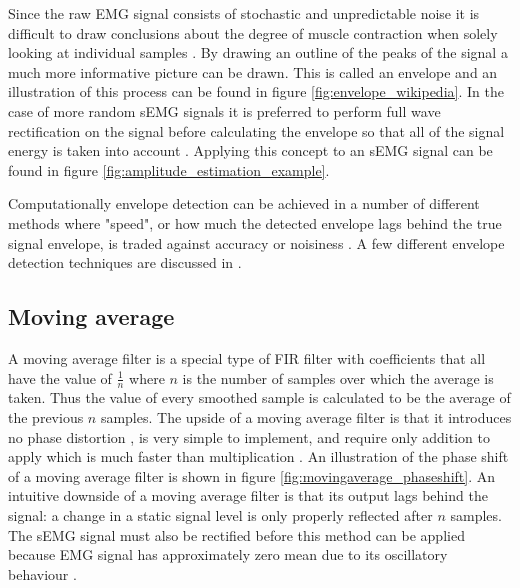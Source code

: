 Since the raw EMG signal consists of stochastic and unpredictable noise it is difficult to draw conclusions about the degree of muscle contraction when solely looking at individual samples \cite{semg_signals_analysis_and_applications}. By drawing an outline of the peaks of the signal a much more informative picture can be drawn. This is called an envelope and an illustration of this process can be found in figure \ref{fig:envelope_wikipedia}. In the case of more random sEMG signals it is preferred to perform full wave rectification on the signal before calculating the envelope so that all of the signal energy is taken into account \cite{semg_signals_analysis_and_applications}. Applying this concept to an sEMG signal can be found in figure \ref{fig:amplitude_estimation_example}.

Computationally envelope detection can be achieved in a number of different methods where "speed", or how much the detected envelope lags behind the true signal envelope, is traded against accuracy or noisiness \cite{dsp_good_bad_ugly}. A few different envelope detection techniques are discussed in \cite{rose2011electromyogram}.

\subsection{Moving average}
A moving average filter is a special type of FIR filter with coefficients that all have the value of $\frac{1}{n}$ where $n$ is the number of samples over which the average is taken. Thus the value of every smoothed sample is calculated to be the average of the previous $n$ samples. The upside of a moving average filter is that it introduces no phase distortion \cite{fir_filter_properties}, is very simple to implement, and require only addition to apply which is much faster than multiplication \cite{smith_moving_average_filters}. An illustration of the phase shift of a moving average filter is shown in figure \ref{fig:movingaverage_phaseshift}. An intuitive downside of a moving average filter is that its output lags behind the signal: a change in a static signal level is only properly reflected after $n$ samples. The sEMG signal must also be rectified before this method can be applied because EMG signal has approximately zero mean due to its oscillatory behaviour \cite{rose2011electromyogram}.

